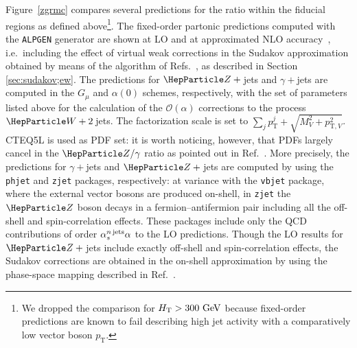 \documentclass[11pt]{cernrep}
\begin{document}
%
Figure~\ref{zgrmc} compares several predictions for the ratio within
the fiducial regions as defined above\footnote{We dropped the
  comparison for $H_{\mathrm{T}}>300~\text{GeV}$ because fixed-order
  predictions are known to fail describing high jet activity with a
  comparatively low vector boson $p_{\mathrm{T}}$.}. The fixed-order
partonic predictions computed with the {\tt ALPGEN} generator are
shown at LO and at approximated NLO accuracy~\cite{Chiesa:2013yma},
i.e.\ including the effect of virtual weak corrections in the Sudakov
approximation obtained by means of the algorithm of
Refs.~\cite{Denner:2000jv,Denner:2001gw}, as described in Section
\ref{sec:sudakov;ew}. The predictions for $\PZ+{}$jets and
$\gamma+{}$jets are computed in the $G_{\mu}$ and $\alpha(0)$ schemes,
respectively, with the set of parameters listed above for the
calculation of the $\mathcal{O}(\alpha)$ corrections to the process
$\PW+2\,$jets. The factorization scale is set to $\sum_j
p_{\mathrm{T}}^j +\sqrt{M^2_V +p^2_{\mathrm{T},V}}$. CTEQ5L is used as
PDF set: it is worth noticing, however, that PDFs largely cancel in
the $\PZ/\gamma$ ratio as pointed out in Ref.~\cite{Ask:2011xf}.  More
precisely, the predictions for $\gamma+{}$jets and $\PZ+{}$jets are
computed by using the {\tt phjet} and {\tt zjet} packages,
respectively: at variance with the {\tt vbjet} package, where the
external vector bosons are produced on-shell, in {\tt zjet} the $\PZ$
boson decays in a fermion--antifermion pair including all the off-shell
and spin-correlation effects. These packages include only the QCD
contributions of order $\alpha_s^{n \, {\rm jets}} \alpha$ to the LO
predictions. Though the LO results for $\PZ+{}$jets include exactly
off-shell and spin-correlation effects, the Sudakov corrections are
obtained in the on-shell approximation by using the phase-space
mapping described in Ref.~\cite{Denner:2014ina}.
\end{document}
